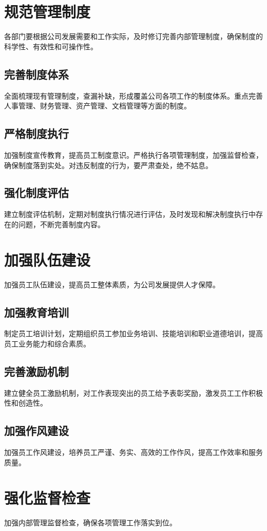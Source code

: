 \documentclass{common-doc}
\begin{document}
\section{规范管理制度}
各部门要根据公司发展需要和工作实际，及时修订完善内部管理制度，确保制度的科学性、有效性和可操作性。

\subsection{完善制度体系}
全面梳理现有管理制度，查漏补缺，形成覆盖公司各项工作的制度体系。重点完善人事管理、财务管理、资产管理、文档管理等方面的制度。

\subsection{严格制度执行}
加强制度宣传教育，提高员工制度意识。严格执行各项管理制度，加强监督检查，确保制度落到实处。对违反制度的行为，要严肃查处，绝不姑息。

\subsection{强化制度评估}
建立制度评估机制，定期对制度执行情况进行评估，及时发现和解决制度执行中存在的问题，不断完善制度内容。

\section{加强队伍建设}
加强员工队伍建设，提高员工整体素质，为公司发展提供人才保障。

\subsection{加强教育培训}
制定员工培训计划，定期组织员工参加业务培训、技能培训和职业道德培训，提高员工业务能力和综合素质。

\subsection{完善激励机制}
建立健全员工激励机制，对工作表现突出的员工给予表彰奖励，激发员工工作积极性和创造性。

\subsection{加强作风建设}
加强员工作风建设，培养员工严谨、务实、高效的工作作风，提高工作效率和服务质量。

\section{强化监督检查}
加强内部管理监督检查，确保各项管理工作落实到位。
\end{document}
